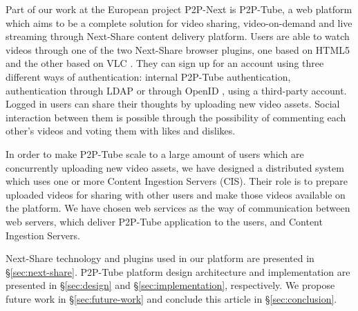 Part of our work at the European project P2P-Next \cite{p2p-next} is P2P-Tube, a web platform which aims to be a complete solution for video sharing, video-on-demand and live streaming through Next-Share \cite{next-share} content delivery platform. Users are able to watch videos through one of the two Next-Share browser plugins, one based on HTML5 and the other based on VLC \cite{vlc}. They can sign up for an account using three different ways of authentication: internal P2P-Tube authentication, authentication through LDAP \cite{ldap} or through OpenID \cite{openid}, using a third-party account. Logged in users can share their thoughts by uploading new video assets. Social interaction between them is possible through the possibility of commenting each other's videos and voting them with likes and dislikes.

In order to make P2P-Tube scale to a large amount of users which are concurrently uploading new video assets, we have designed a distributed system which uses one or more Content Ingestion Servers (CIS). Their role is to prepare uploaded videos for sharing with other users and make those videos available on the platform. We have chosen web services as the way of communication between web servers, which deliver P2P-Tube application to the users, and Content Ingestion Servers.

Next-Share technology and plugins used in our platform are presented in \S \ref{sec:next-share}. P2P-Tube platform design architecture and implementation are presented in \S \ref{sec:design} and \S \ref{sec:implementation}, respectively. We propose future work in \S \ref{sec:future-work} and conclude this article in \S \ref{sec:conclusion}.
